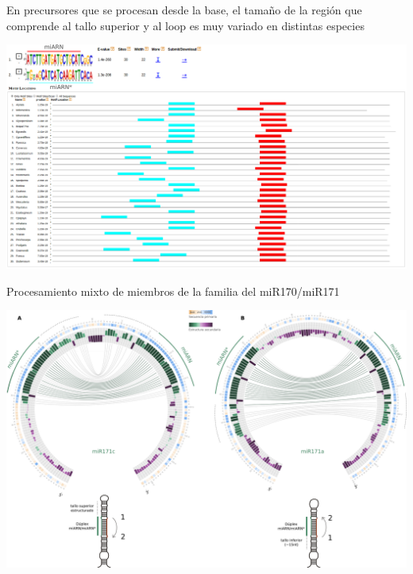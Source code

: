 \documentclass{beamer}
\begin{document}
\begin{frame}{En precursores que se procesan desde la base, el tamaño de la región que comprende al tallo superior y al loop es muy variado en distintas especies}
	\begin{center}
		\includegraphics[width=1\textwidth]{img/miR172_meme.png}
	\end{center}
\end{frame}

\begin{frame}{Procesamiento mixto de miembros de la familia del miR170/miR171}
	\begin{center}
		\includegraphics[width=1\textwidth]{img/familia_miR171_circos.png}
	\end{center}
\end{frame}

\end{document}

